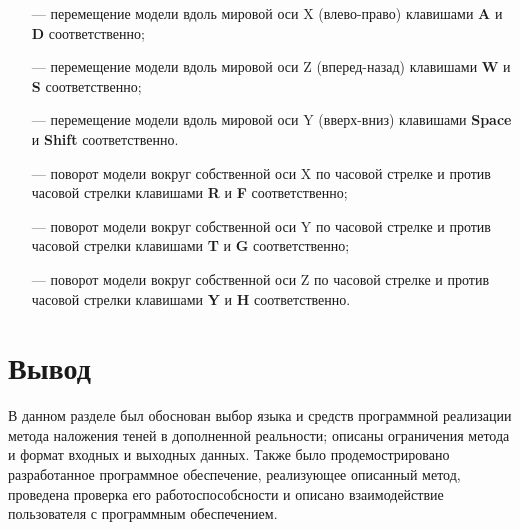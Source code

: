 \begin{itemize}
	\item[---] перемещение модели вдоль мировой оси X (влево-право) клавишами \textbf{A} и \textbf{D} соответственно;
	\item[---] перемещение модели вдоль мировой оси Z (вперед-назад) клавишами \textbf{W} и \textbf{S} соответственно;
	\item[---] перемещение модели вдоль мировой оси Y (вверх-вниз) клавишами \textbf{Space} и \textbf{Shift} соответственно.
	\item[---] поворот модели вокруг собственной оси X по часовой стрелке и против часовой стрелки клавишами \textbf{R} и \textbf{F} соответственно;
	\item[---] поворот модели вокруг собственной оси Y по часовой стрелке и против часовой стрелки клавишами \textbf{T} и \textbf{G} соответственно;
	\item[---] поворот модели вокруг собственной оси Z по часовой стрелке и против часовой стрелки клавишами \textbf{Y} и \textbf{H} соответственно.
\end{itemize}

\section*{Вывод}

В данном разделе был обоснован выбор языка и средств программной реализации метода наложения теней в дополненной реальности; описаны ограничения метода и формат входных и выходных данных. Также было продемострировано разработанное программное обеспечение, реализующее описанный метод, проведена проверка его работоспособсности и описано взаимодействие пользователя с программным обеспечением.